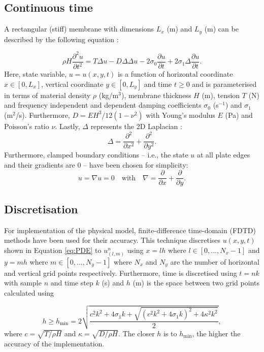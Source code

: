 \documentclass{vgtc}
\begin{document}
\subsection{Continuous time}
A rectangular (stiff) membrane with dimensions $L_x$ (m) and $L_y$ (m) can be described by the following equation \cite{bilbao2009numerical}:

\begin{equation}
\rho H\frac{\partial^2u}{\partial t^2} = T\Delta u - D\Delta\Delta u - 2 \sigma_0\frac{\partial u}{\partial t} + 2 \sigma_1 \Delta \frac{\partial u}{\partial t}.
\end{equation}
Here, state variable, $u = u(x,y,t)$ is a function of horizontal coordinate $x \in [0, L_x]$, vertical coordinate $y \in [0, L_y]$ and time $t\geq0$ and is parameterised in terms of material density $\rho$ (kg/m$^3$), membrane thickness $H$ (m), tension $T$ (N) and frequency independent and dependent damping coefficients $\sigma_0$ (s$^{-1}$) and $\sigma_1$ (m$^2$/s). Furthermore, $D = EH^3/12(1-\nu^2)$ with Young's modulus $E$ (Pa) and Poisson's ratio $\nu$. Lastly, $\Delta$ represents the 2D Laplacian \cite{bilbao2009numerical}:
\begin{equation}\label{eq:PDE}
    \Delta = \frac{\partial^2}{\partial x^2} + \frac{\partial^2}{\partial y^2}.
\end{equation}
Furthermore, clamped boundary conditions -- i.e., the state $u$ at all plate edges and their gradients are 0 -- have been chosen for simplicity:
\begin{equation}
    u = \nabla u = 0 \quad \text{with} \quad \nabla = \frac{\partial}{\partial x} + \frac{\partial}{\partial y}.
\end{equation}
\subsection{Discretisation}
For implementation of the physical model, finite-difference time-domain (FDTD) methods have been used for their accuracy. This technique discretises $u(x,y,t)$ shown in Equation \eqref{eq:PDE} to $u_{(l,m)}^n$ using $x=lh$ where $l \in [0, ..., N_x-1]$ and $y=mh$ where $m \in [0, ..., N_y-1]$ where $N_x$ and $N_y$ are the number of horizontal and vertical grid points respectively. Furthermore, time is discretised using $t = nk$ with sample $n$ and time step $k$ (s) and $h$ (m) is the space between two grid points calculated using 

\begin{equation}\label{eq:h}
    h \geq h_\text{min} =  2\sqrt{\frac{c^2k^2 + 4\sigma_1k + \sqrt{(c^2k^2 + 4\sigma_1k)^2 + 4\kappa^2 k^2} }{2}},
\end{equation}
where $c = \sqrt{T/\rho H}$ and $\kappa = \sqrt{D/\rho H}$. The closer $h$ is to $h_\text{min}$, the higher the accuracy of the implementation.
\end{document}
